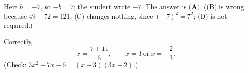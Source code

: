 Here $b=-7$, so $-b=7$; the student wrote $-7$. The answer is $\boxed{\textbf{(A)}}$. ((B) is wrong because $49+72=121$; (C) changes nothing, since $(-7)^2=7^2$; (D) is not required.)

Correctly,
\[x=\dfrac{7\pm11}{6},\qquad x=\boxed{3}\ \text{or}\ x=\boxed{-\dfrac23}.\]
(Check: $3x^2-7x-6=(x-3)(3x+2)$.)
